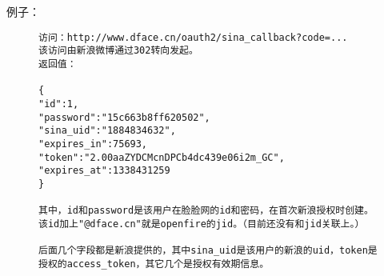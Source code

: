 \documentclass[cs4size]{ctexartutf8}
\begin{document}
例子：

\begin{figure}[H]
\begin{verbatim}
访问：http://www.dface.cn/oauth2/sina_callback?code=...
该访问由新浪微博通过302转向发起。
返回值：

{
"id":1,
"password":"15c663b8ff620502",
"sina_uid":"1884834632",
"expires_in":75693,
"token":"2.00aaZYDCMcnDPCb4dc439e06i2m_GC",
"expires_at":1338431259
}

其中，id和password是该用户在脸脸网的id和密码，在首次新浪授权时创建。该id加上"@dface.cn"就是openfire的jid。（目前还没有和jid关联上。）

后面几个字段都是新浪提供的，其中sina_uid是该用户的新浪的uid，token是授权的access_token，其它几个是授权有效期信息。

\end{verbatim}
\end{figure}



\newpage
\end{document}
